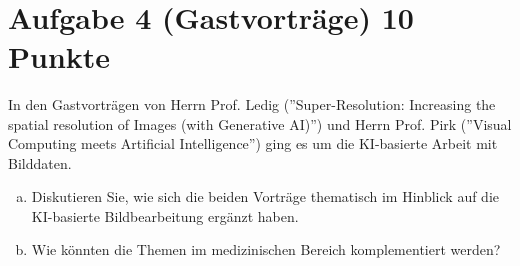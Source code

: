 \documentclass[12pt, ngerman]{AssignmentClass}
\begin{document}
    \begin{answerbox}
		\noindent
		\fbox{\parbox[c]{\textwidth}{
				\vspace{8cm}
				\hspace{\textwidth}
		}}\\
	\end{answerbox}

\section*{Aufgabe 4 (Gastvorträge) \hfill 10 Punkte}
    In den Gastvorträgen von Herrn Prof. Ledig (''Super-Resolution: Increasing the spatial resolution of Images (with Generative AI)'') und
    Herrn Prof. Pirk (''Visual Computing meets Artificial Intelligence'') ging es um die KI-basierte Arbeit mit Bilddaten.
    \begin{enumerate}[a)]
        \item Diskutieren Sie, wie sich die beiden Vorträge thematisch im Hinblick auf die KI-basierte Bildbearbeitung ergänzt haben.
        \item Wie könnten die Themen im medizinischen Bereich komplementiert werden?
    \end{enumerate}
\end{document}
